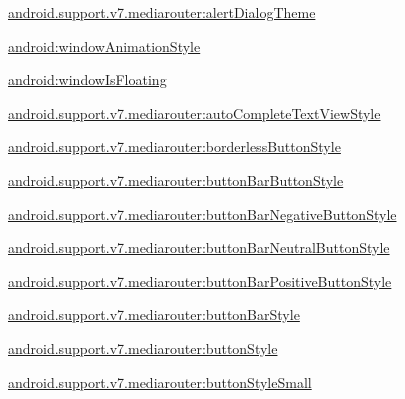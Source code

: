 {\ttfamily \hyperlink{classandroid_1_1support_1_1v7_1_1mediarouter_1_1R_1_1styleable_a2053a143324d9fce095f3e158a2ec295}{android.\+support.\+v7.\+mediarouter\+:alert\+Dialog\+Theme}}

{\ttfamily \hyperlink{classandroid_1_1support_1_1v7_1_1mediarouter_1_1R_1_1styleable_a09c1f30862ae9d1ce8431309e49a7d43}{android\+:window\+Animation\+Style}}

{\ttfamily \hyperlink{classandroid_1_1support_1_1v7_1_1mediarouter_1_1R_1_1styleable_aa1cdfff61dbd73fcb80e68bc2f4f7417}{android\+:window\+Is\+Floating}}

{\ttfamily \hyperlink{classandroid_1_1support_1_1v7_1_1mediarouter_1_1R_1_1styleable_a21b934ac6667c4b9a8b9c730d467e140}{android.\+support.\+v7.\+mediarouter\+:auto\+Complete\+Text\+View\+Style}}

{\ttfamily \hyperlink{classandroid_1_1support_1_1v7_1_1mediarouter_1_1R_1_1styleable_a8a952ea02e2851785b478be273bb3224}{android.\+support.\+v7.\+mediarouter\+:borderless\+Button\+Style}}

{\ttfamily \hyperlink{classandroid_1_1support_1_1v7_1_1mediarouter_1_1R_1_1styleable_ad20f3db7aa5369c7dcfc5bd51371b85a}{android.\+support.\+v7.\+mediarouter\+:button\+Bar\+Button\+Style}}

{\ttfamily \hyperlink{classandroid_1_1support_1_1v7_1_1mediarouter_1_1R_1_1styleable_a5149daf27bddf85d912f992f8fa8acd1}{android.\+support.\+v7.\+mediarouter\+:button\+Bar\+Negative\+Button\+Style}}

{\ttfamily \hyperlink{classandroid_1_1support_1_1v7_1_1mediarouter_1_1R_1_1styleable_aff182cdd74b6dce4c8c16447cb6760e6}{android.\+support.\+v7.\+mediarouter\+:button\+Bar\+Neutral\+Button\+Style}}

{\ttfamily \hyperlink{classandroid_1_1support_1_1v7_1_1mediarouter_1_1R_1_1styleable_a43d9a32374dba702819c4ec6c05ab691}{android.\+support.\+v7.\+mediarouter\+:button\+Bar\+Positive\+Button\+Style}}

{\ttfamily \hyperlink{classandroid_1_1support_1_1v7_1_1mediarouter_1_1R_1_1styleable_af5a3bc9fc8ba28ff915f6087ef908076}{android.\+support.\+v7.\+mediarouter\+:button\+Bar\+Style}}

{\ttfamily \hyperlink{classandroid_1_1support_1_1v7_1_1mediarouter_1_1R_1_1styleable_ad16bbba5da5476638832d9e2a54b7abe}{android.\+support.\+v7.\+mediarouter\+:button\+Style}}

{\ttfamily \hyperlink{classandroid_1_1support_1_1v7_1_1mediarouter_1_1R_1_1styleable_aec6eece48285252661fdccd6314fc69a}{android.\+support.\+v7.\+mediarouter\+:button\+Style\+Small}}

